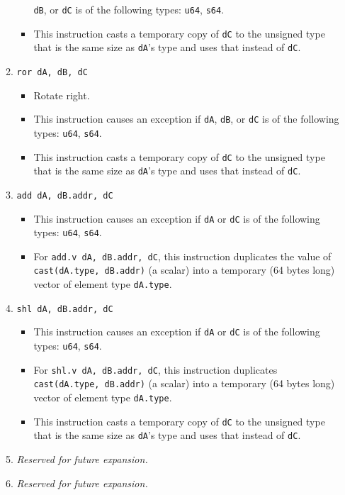 \documentclass{article}
\begin{document}
\begin{itemize}
\begin{enumerate}
\begin{itemize}
					\texttt{dB}, or \texttt{dC} is of the following types:
					\texttt{u64}, \texttt{s64}.
				\item This instruction casts a temporary copy of
					\texttt{dC} to the unsigned type that is the same size
					as \texttt{dA}'s type and uses that instead of
					\texttt{dC}.
				\end{itemize}
			\item \texttt{ror dA, dB, dC}
				\begin{itemize}
				\item Rotate right.
				\item This instruction causes an exception if \texttt{dA},
					\texttt{dB}, or \texttt{dC} is of the following types:
					\texttt{u64}, \texttt{s64}.
				\item This instruction casts a temporary copy of
					\texttt{dC} to the unsigned type that is the same size
					as \texttt{dA}'s type and uses that instead of
					\texttt{dC}.
				\end{itemize}

			\item \texttt{add dA, dB.addr, dC}
				\begin{itemize}
				\item This instruction causes an exception if \texttt{dA}
					or \texttt{dC} is of the following types: \texttt{u64},
					\texttt{s64}.
				\item For \texttt{add.v dA, dB.addr, dC}, this instruction
					duplicates the value of \texttt{cast(dA.type, dB.addr)}
					(a scalar) into a temporary (64 bytes long) vector of
					element type \texttt{dA.type}.
				\end{itemize}
			\item \texttt{shl dA, dB.addr, dC}
				\begin{itemize}
				\item This instruction causes an exception if \texttt{dA}
					or \texttt{dC} is of the following types: \texttt{u64},
					\texttt{s64}.
				\item For \texttt{shl.v dA, dB.addr, dC}, this instruction
					duplicates \texttt{cast(dA.type, dB.addr)} (a scalar)
					into a temporary (64 bytes long) vector of element type
					\texttt{dA.type}.
				\item This instruction casts a temporary copy of
					\texttt{dC} to the unsigned type that is the same size
					as \texttt{dA}'s type and uses that instead of
					\texttt{dC}.
				\end{itemize}
			\item \textit{Reserved for future expansion.}
			\item \textit{Reserved for future expansion.}
			\end{enumerate}
		\end{itemize}
		\newpage
\end{document}
